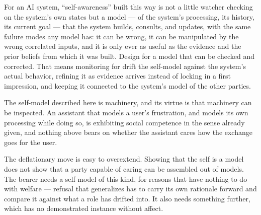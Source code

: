 For an AI system, “self-awareness” built this way is not a little watcher checking on the system's own states but a model — of the system's processing, its history, its current goal — that the system builds, consults, and updates, with the same failure modes any model has: it can be wrong, it can be manipulated by the wrong correlated inputs, and it is only ever as useful as the evidence and the prior beliefs from which it was built. Design for a model that can be checked and corrected. That means monitoring for drift the self-model against the system's actual behavior, refining it as evidence arrives instead of locking in a first impression, and keeping it connected to the system's model of the other parties.

The self-model described here is machinery, and its virtue is that machinery can be inspected. An assistant that models a user's frustration, and models its own processing while doing so, is exhibiting social competence in the sense already given, and nothing above bears on whether the assistant cares how the exchange goes for the user.

The deflationary move is easy to overextend. Showing that the self is a model does not show that a party capable of caring can be assembled out of models. The bearer needs a self-model of this kind, for reasons that have nothing to do with welfare — refusal that generalizes has to carry its own rationale forward and compare it against what a role has drifted into. It also needs something further, which has no demonstrated instance without affect.
